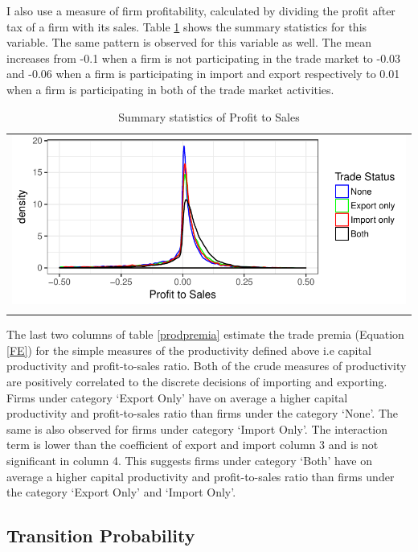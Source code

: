 \documentclass[12pt]{article}
\begin{document}
I also use a measure of firm profitability, calculated by dividing the profit
after tax of
a firm with its sales. Table \ref{tab:pts} shows the summary
statistics for this variable. The same pattern is observed for this variable as well. The mean increases from -0.1 when a firm is not participating in
the trade market to -0.03 and  -0.06 when a firm is participating in
import and export respectively to 0.01 when a firm is participating in
both of the trade market activities.  
   
\begin{center}
\begin{table}[H]
\caption{Summary statistics of Profit to Sales}
\label{tab:pts}
\begin{tabular}{c}
 \includegraphics{./PICS/denspatsales.pdf}   \\ 
   \\  
\end{tabular}
\end{table}
\end{center}


The last two columns of table \ref{prodpremia} estimate the trade
premia (Equation \ref{FE}) for the simple measures of the productivity defined above i.e
capital productivity and profit-to-sales ratio. Both
of the crude measures of productivity are positively correlated to the discrete
decisions of importing and exporting.  Firms under category `Export
Only' have on average a  higher
capital productivity and profit-to-sales ratio than firms under
the category `None'. The same is also observed for firms under category
`Import Only'.  The interaction term is lower than the coefficient of export and
 import column 3 and 
is not significant in column 4. This suggests firms under category
`Both' have on average a higher capital productivity and profit-to-sales ratio than
firms under the category `Export Only' and `Import Only'. 

\subsection{Transition Probability}
\end{document}
